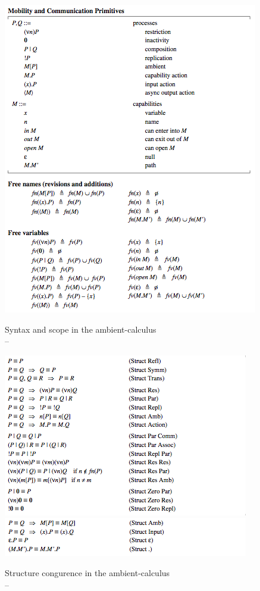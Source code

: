 \begin{table} [p]
  \begin{center}
  \includegraphics[scale=1]{ambient.png}
  \end{center}
  \captionsetup{justification=centering}  
  \caption{Syntax and scope in the ambient-calculus \\ -- \citep{Cardelli98mobileambients}}
  \label{ambient-syn}
\end{table}

\begin{table} [p]
  \begin{center}
  \includegraphics[scale=1]{ambient_str_1.png}
  \includegraphics[scale=1]{ambient_str_2.png}
  \end{center}
  \captionsetup{justification=centering}    
  \caption{Structure congurence in the ambient-calculus \\ -- \citep{Cardelli98mobileambients}}
  \label{ambient-str}
\end{table}

